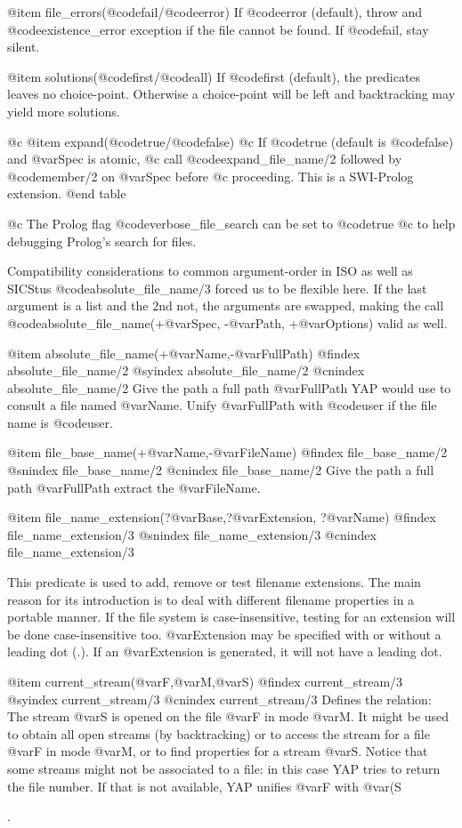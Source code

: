 {{{{{    @item file_errors(@code{fail}/@code{error})
If @code{error} (default), throw and @code{existence_error} exception
if the file cannot be found.  If @code{fail}, stay silent.

    @item solutions(@code{first}/@code{all})
If @code{first} (default), the predicates leaves no choice-point.
Otherwise a choice-point will be left and backtracking may yield
more solutions.

@c     @item expand(@code{true}/@code{false})
@c If @code{true} (default is @code{false}) and @var{Spec} is atomic,
@c call @code{expand_file_name/2} followed by @code{member/2} on @var{Spec} before
@c proceeding.  This is a SWI-Prolog extension.
@end table

@c The Prolog flag @code{verbose_file_search} can be set to @code{true}
@c to help debugging Prolog's search for files.

Compatibility considerations to common argument-order in ISO as well
as SICStus @code{absolute_file_name/3} forced us to be flexible here.
If the last argument is a list and the 2nd not, the arguments are
swapped, making the call @code{absolute_file_name}(+@var{Spec}, -@var{Path},
+@var{Options}) valid as well.

@item absolute_file_name(+@var{Name},-@var{FullPath})
@findex absolute_file_name/2
@syindex absolute_file_name/2
@cnindex absolute_file_name/2
Give the path a full path @var{FullPath} YAP would use to consult a file
named @var{Name}.  Unify @var{FullPath} with @code{user} if the file
name is @code{user}.

@item file_base_name(+@var{Name},-@var{FileName})
@findex file_base_name/2
@snindex file_base_name/2
@cnindex file_base_name/2
Give the path a full path @var{FullPath} extract the @var{FileName}.

@item file_name_extension(?@var{Base},?@var{Extension}, ?@var{Name})
@findex file_name_extension/3
@snindex file_name_extension/3
@cnindex file_name_extension/3

This predicate is used to add, remove or test filename extensions. The
main reason for its introduction is to deal with different filename
properties in a portable manner. If the file system is
case-insensitive, testing for an extension will be done
case-insensitive too. @var{Extension} may be specified with or
without a leading dot (.). If an @var{Extension} is generated, it
will not have a leading dot.

@item current_stream(@var{F},@var{M},@var{S})
@findex current_stream/3
@syindex current_stream/3
@cnindex current_stream/3
Defines the relation: The stream @var{S} is opened on the file @var{F}
in mode @var{M}. It might be used to obtain all open streams (by
backtracking) or to access the stream for a file @var{F} in mode
@var{M}, or to find properties for a stream @var{S}. Notice that some
streams might not be associated to a file: in this case YAP tries to
return the file number. If that is not available, YAP unifies @var{F}
with @var(S}.

}}}}
